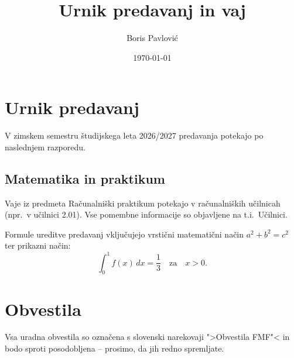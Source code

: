 \documentclass[a4paper, 10pt]{article}
\title{Urnik predavanj in vaj}
\author{Boris Pavlović}
\date{\today}
\begin{document}
\maketitle

\section{Urnik predavanj}
V zimskem semestru študijskega leta 2026/2027 predavanja potekajo po naslednjem razporedu.

\subsection{Matematika in praktikum}
Vaje iz predmeta Računalniški praktikum potekajo v računalniških učilnicah (npr.\ v učilnici 2.01). Vse pomembne informacije so objavljene na t.i.\ Učilnici.

Formule ureditve predavanj vključujejo vrstični matematični način \( a^2 + b^2 = c^2 \) ter prikazni način:
\[
  \int_0^1 f(x) \, dx = \frac{1}{3} \quad \text{za} \quad x > 0.
\]

\section{Obvestila}
Vsa uradna obvestila so označena s slovenski narekovaji ">Obvestila FMF"< in bodo sproti posodobljena -- prosimo, da jih redno spremljate.
\end{document}
